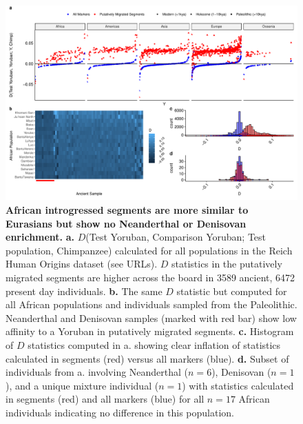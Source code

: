 \documentclass{article}
\begin{document}
\begin{figure}
	\centering
	\includegraphics[width=\textwidth]{plot/new_dstats.pdf}
	\caption{{\bf African introgressed segments are more similar to Eurasians but show no Neanderthal or Denisovan enrichment.} {\bf a.} $D$(Test Yoruban, Comparison Yoruban; Test population, Chimpanzee) calculated for all populations in the Reich Human Origins dataset (see URLs). $D$ statistics in the putatively migrated segments are higher across the board in 3589 ancient, 6472 present day individuals. {\bf b.} The same $D$ statistic but computed for all African populations and individuals sampled from the Paleolithic. Neanderthal and Denisovan samples (marked with red bar) show low affinity to a Yoruban in putatively migrated segments. {\bf c.} Histogram of $D$ statistics computed in a. showing clear inflation of statistics calculated in segments (red) versus all markers (blue). {\bf d.} Subset of individuals from a. involving Neanderthal ($n = 6$),  Denisovan ($n=1$), and a unique mixture individual ($n=1$) with statistics calculated in segments (red) and all markers (blue) for all $n=17$ African individuals indicating no difference in this population.} 
	\label{dstats}
\end{figure}
\end{document}
